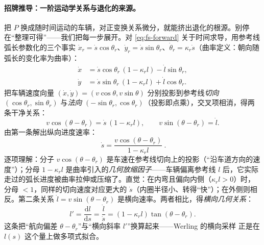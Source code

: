\paragraph{招牌推导：一阶运动学关系与退化的来源。}
把 $P$ 换成随时间运动的车辆，对正变换关系微分，就能挤出退化的根源。别停在“整理可得”——我们把每一步展开。对 \cref{eq:fs-forward} 关于时间求导，用参考线弧长参数化的三个事实 $\dot x_r=\dot s\cos\theta_r$、$\dot y_r=\dot s\sin\theta_r$、$\dot\theta_r=\kappa_r\dot s$（曲率定义：朝向随弧长的变化率为曲率）：
\begin{align}
  \dot x &= \dot s\cos\theta_r\,(1-\kappa_r l)-\dot l\sin\theta_r, \label{eq:fs-xdot}\\
  \dot y &= \dot s\sin\theta_r\,(1-\kappa_r l)+\dot l\cos\theta_r. \label{eq:fs-ydot}
\end{align}
把车辆速度向量 $(\dot x,\dot y)=(v\cos\theta,v\sin\theta)$ 分别投影到参考线\emph{切向} $(\cos\theta_r,\sin\theta_r)$ 与\emph{法向} $(-\sin\theta_r,\cos\theta_r)$（投影即点乘），交叉项相消，得两条干净关系：
\begin{equation}
  v\cos(\theta-\theta_r)=\dot s\,(1-\kappa_r l),\qquad
  v\sin(\theta-\theta_r)=\dot l.
  \label{eq:fs-tangnorm}
\end{equation}
由第一条解出纵向进度速率：
\begin{equation}
  \boxed{\ \dot s=\frac{v\cos(\theta-\theta_r)}{1-\kappa_r l}\ }.
  \label{eq:fs-sdot}
\end{equation}
逐项理解：分子 $v\cos(\theta-\theta_r)$ 是车速在参考线切向上的投影（“沿车道方向的速度”）；分母 $1-\kappa_r l$ 是曲率引入的\emph{几何放缩因子}——车辆偏离参考线 $l$ 后，它实际走过的弧长进度被曲率拉伸或压缩了。直觉：在内弯且偏向内侧（$\kappa_r l>0$）时，分母 $<1$，同样的切向速度对应更大的 $\dot s$（内圈半径小、转得“快”）；在外侧则相反。第二条关系 $\dot l=v\sin(\theta-\theta_r)$ 是横向速率。两者相比，得\emph{横向几何关系}：
\begin{equation}
  l'=\frac{\mathrm{d}l}{\mathrm{d}s}=\frac{\dot l}{\dot s}=(1-\kappa_r l)\tan(\theta-\theta_r).
  \label{eq:fs-lprime}
\end{equation}
这条把“航向偏差 $\theta-\theta_r$”与“横向斜率 $l'$”换算起来——Werling 的横向采样\cite{werling2010frenet} 正是在 $l(s)$ 这个量上做多项式拟合。

